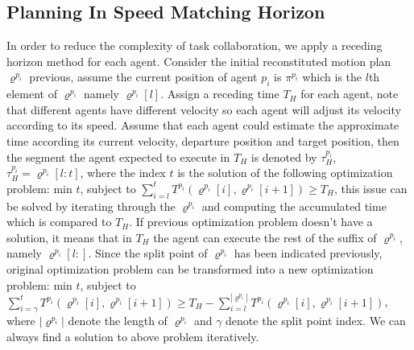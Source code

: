 \documentclass[journal]{IEEEtran}
\begin{document}
\subsection{Planning In Speed Matching Horizon}
In order to reduce the complexity of task collaboration, we apply a receding horizon method for each agent. Consider the initial reconstituted motion plan $\varrho^{p_i}$ previous, assume the current position of agent $p_i$ is $\pi^{p_i}$ which is the $l$th element of $\varrho^{p_i}$ namely $\varrho^{p_i}[l]$. Assign a receding time $T_H$ for each agent, note that different agents have different velocity so each agent will adjust its velocity according to its speed. Assume that each agent could estimate the approximate time according its current velocity, departure position and target position, then the segment the agent expected to execute in $T_H$ is denoted by $\tau^{p_i}_H$, $\tau^{p_i}_H = \varrho^{p_i}[l:t]$, where the index $t$ is the solution of the following optimization problem: min $t$, subject to $\sum_{i=l}^{t}T^{p_i}(\varrho^{p_i}[i],\varrho^{p_i}[i+1])\geq T_H$, this issue can be solved by iterating through the $\varrho^{p_i}$ and computing the accumulated time which is compared to $T_H$. If previous optimization problem doesn't have a solution, it means that in $T_H$ the agent can execute the rest of the suffix of $\varrho^{p_i}$, namely $\varrho^{p_i}[l:]$. Since the split point of $\varrho^{p_i}$ has been indicated previously, original optimization problem can be transformed into a new optimization problem: min $t$, subject to $\sum_{i=\gamma}^{t}T^{p_i}(\varrho^{p_i}[i],\varrho^{p_i}[i+1])\geq T_H - \sum_{i=l}^{|\varrho^{p_i}|}T^{p_i}(\varrho^{p_i}[i],\varrho^{p_i}[i+1])$, where $|\varrho^{p_i}|$ denote the length of $\varrho^{p_i}$ and $\gamma$ denote the split point index. We can always find a solution to above problem iteratively.
\end{document}
